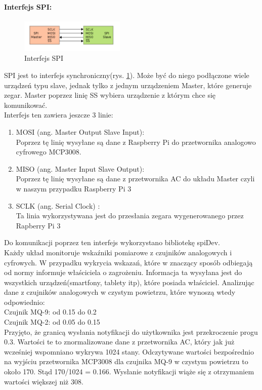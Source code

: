 \paragraph{Interfejs SPI:}
\begin{figure}[ht]
	\centering
	\includegraphics[width=5cm]{SPI.png}
	\caption{Interfejs SPI \protect\cite{spi}}
	\label{spi}
\end{figure}
SPI jest to interfejs synchroniczny(rys. \ref{spi}). Może być do niego podłączone wiele urządzeń typu slave, jednak tylko z jednym urządzeniem Master, które generuje zegar. Master poprzez linię SS wybiera urządzenie z którym chce się komunikować. \\
Interfejs ten zawiera jeszcze 3 linie:
\begin{enumerate} 
\item MOSI (ang. Master Output Slave Input): \\
Poprzez tę linię wysyłane są dane z Raspberry Pi do przetwornika analogowo cyfrowego MCP3008.
\item MISO (ang. Master Input Slave Output):\\
Poprzez tę linię wysyłane są dane z przetwornika AC do układu Master czyli w naszym przypadku Raspberry Pi 3
\item SCLK (ang. Serial Clock) :\\
Ta linia wykorzystywana jest do przesłania zegara wygenerowanego przez Rapberry Pi 3
\end{enumerate}
Do komunikacji poprzez ten interfejs wykorzystano bibliotekę spiDev. \\
Każdy układ monitoruje wskaźniki pomiarowe z czujników analogowych i cyfrowych. W przypadku wykrycia wskazań, które w znaczący sposób odbiegają od normy informuje właściciela o zagrożeniu. Informacja ta wysyłana jest do wszystkich urządzeń(smartfony, tablety itp), które posiada właściciel.  Analizując dane z czujników analogowych w czystym powietrzu, które wynoszą wtedy odpowiednio:\\
Czujnik MQ-9: od 0.15 do 0.2\\
Czujnik MQ-2: od 0.05 do 0.15\\
Przyjęto, że granicą wysłania notyfikacji do użytkownika jest przekroczenie progu 0.3. Wartości te to znormalizowane dane z przetwornika AC, który jak już wcześniej wspomniano wykrywa 1024 stany. Odczytywane wartości bezpośrednio na wyjściu przetwornika MCP3008 dla czujnika MQ-9 w czystym powietrzu to około 170. Stąd 170/1024 = 0.166. Wysłanie notyfikacji wiąże się z otrzymaniem wartości większej niż 308.
